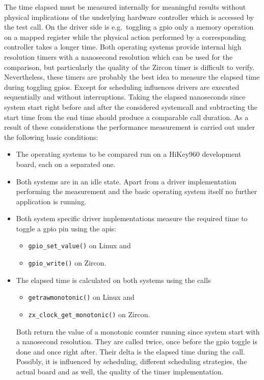 The time elapsed must be measured internally for meaningful results without physical implications of the underlying hardware controller which is accessed by the test call.
On the driver side is e.g.\ toggling a \ac{gpio} only a memory operation on a mapped register while the physical action performed by a corresponding controller takes a longer time.
Both operating systems provide internal high resolution timers with a nanosecond resolution which can be used for the comparison, but particularly the quality of the Zircon timer is difficult to verify.
Nevertheless, these timers are probably the best idea to measure the elapsed time during toggling \acp{gpio}.
Except for scheduling influences drivers are executed sequentially and without interruptions.
Taking the elapsed nanoseconds since system start right before and after the considered systemcall and subtracting the start time from the end time should produce a comparable call duration.
\newpage
As a result of these considerations the performance measurement is carried out under the following basic conditions:
\begin{itemize}
    \item The operating systems to be compared run on a HiKey960 development board, each on a separated one.
    \item Both systems are in an idle state. Apart from a driver implementation performing the measurement and the basic operating system itself no further application is running.
    \item Both system specific driver implementations measure the required time to toggle a \ac{gpio} pin using the \acp{api}:
        \begin{itemize}
            \item \texttt{gpio_set_value()} on Linux and
            \item \texttt{gpio_write()} on Zircon.
        \end{itemize}
    \item The elapsed time is calculated on both systems using the calls
        \begin{itemize}
            \item \texttt{getrawmonotonic()} on Linux and
            \item \texttt{zx_clock_get_monotonic()} on Zircon.
        \end{itemize}
        Both return the value of a monotonic counter running since system start with a nanosecond resolution.
        They are called twice, once before the \ac{gpio} toggle is done and once right after.
        Their delta is the elapsed time during the call.
        Possibly, it is influenced by scheduling, different scheduling strategies, the actual board and as well, the quality of the timer implementation.
\end{itemize}

